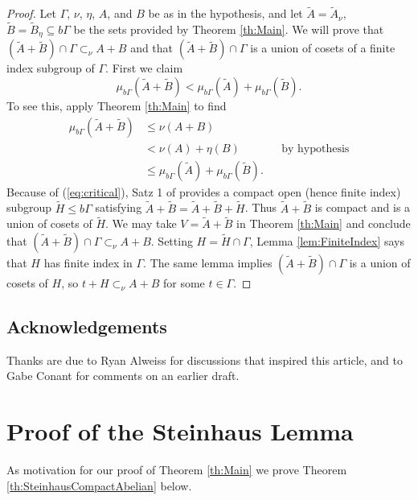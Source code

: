 \documentclass[12pt]{amsart} \usepackage{amsmath,centernot,amssymb,leftindex}
\numberwithin{theorem}{section}
\numberwithin{equation}{section}
\theoremstyle{definition}
\begin{document}
\begin{proof}
	Let $\Gamma$, $\nu$, $\eta$, $A$, and $B$ be as in the hypothesis, and let $\tilde{A} =\tilde{A}_{\nu}$, $ \tilde{B}=\tilde{B}_{\eta}\subseteq b\Gamma$ be the sets provided by Theorem \ref{th:Main}. We will prove that $(\tilde{A}+\tilde{B})\cap \Gamma \subset_{\nu} A+B$ and that $(\tilde{A}+\tilde{B})\cap \Gamma$ is a union of cosets of a finite index subgroup of $\Gamma$. First we claim  
	\begin{equation}\label{eq:critical}
		\mu_{b\Gamma}(\tilde{A}+\tilde{B})<\mu_{b\Gamma}(\tilde{A})+\mu_{b\Gamma}(\tilde{B}).
	\end{equation}  To see this, apply Theorem \ref{th:Main} to find
	\begin{align*}\mu_{b\Gamma}(\tilde{A}+\tilde{B})&\leq \nu(A+B) && \\
		&< \nu(A)+\eta(B)  && \text{by hypothesis} \\ &\leq \mu_{b\Gamma}(\tilde{A})+\mu_{b\Gamma}(\tilde{B}).
	\end{align*}
	Because of (\ref{eq:critical}), Satz 1 of \cite{Kneser_SummenmengenLokalkompakten} provides a compact open (hence finite index) subgroup  $\tilde{H}\leq b\Gamma$ satisfying $\tilde{A}+\tilde{B}=\tilde{A}+\tilde{B}+\tilde{H}$.  Thus $\tilde{A}+\tilde{B}$ is compact and is a union of cosets of $\tilde{H}$.  We may take $V=\tilde{A}+\tilde{B}$ in Theorem \ref{th:Main} and conclude that $(\tilde{A}+\tilde{B})\cap \Gamma \subset_{\nu} A+B$. Setting $H=\tilde{H}\cap \Gamma$, Lemma \ref{lem:FiniteIndex} says that $H$ has finite index in $\Gamma$.  The same lemma implies $(\tilde{A}+\tilde{B})\cap \Gamma$ is a union of cosets of $H$, so $t+H\subset_{\nu} A+B$ for some $t\in \Gamma$.
\end{proof}

\subsection{Acknowledgements}  Thanks are due to Ryan Alweiss for discussions that inspired this article, and to Gabe Conant for comments on an earlier draft.

	
    
	
	\section{Proof of the Steinhaus Lemma}\label{sec:SteinhausProof}
As motivation for our proof of Theorem \ref{th:Main} we prove Theorem \ref{th:SteinhausCompactAbelian} below.  
\end{document}
